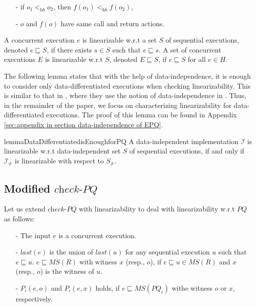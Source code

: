 \begin{itemize}
\item[-] if $o_1 <_{\textit{hb}} o_2$, then $f(o_1) <_{\textit{hb}} f(o_2)$,

\item[-] $o$ and $f(o)$ have same call and return actions.
\end{itemize}

A concurrent execution $e$ is linearizable w.r.t a set $S$ of sequential executions, denoted $e \sqsubseteq S$, if there exists $s \in S$ such that $e \sqsubseteq s$. A set of concurrent executions $E$ is linearizable w.r.t $S$, denoted $E \sqsubseteq S$, if $e \sqsubseteq S$ for all $e \in H$.

The following lemma states that with the help of data-independence, it is enough to consider only data-differentiated executions when checking linearizability. This is similar to that in \cite{Abdulla:2013}, where they use the notion of data-independence in \cite{Wolper:1986}. Thus, in the remainder of the paper, we focus on characterizing linearizability for data-differentiated executions. The proof of this lemma can be found in Appendix \ref{sec:appendix in section data-independence of EPQ}.

\begin{restatable}{lemma}{DataDifferentiatedisEnoughforPQ}
\label{lemma:data differentiated is enough for PQ}
A data-independent implementation $\mathcal{I}$ is linearizable w.r.t data-independent set $S$ of sequential executions, if and only if $\mathcal{I}_{\neq}$ is linearizable with respect to $S_{\neq}$.
\end{restatable}




\subsection{Modified $\textit{check-PQ}$}
\label{subsec:recursive procedure con-check-EPQ}

Let us extend $\textit{check-PQ}$ with linearizability to deal with linearizability w.r.t $\textit{PQ}$ as follows: 

\begin{itemize}
\setlength{\itemsep}{0.5pt}
\item[-] The input $e$ is a concurrent execution. 

\item[-] $\textit{last}(e)$ is the union of $\textit{last}(u)$ for any sequential execution $u$ such that $e \sqsubseteq u$. $e \sqsubseteq \textit{MS}(R)$ with witness $x$ (resp., $o$), if $e \sqsubseteq u \in \textit{MS}(R)$ and $x$ (resp., $o$) is the witness of $u$. 
    
\item[-] $P_i(e,o)$ and $P_i(e,x)$ holds, if $e \sqsubseteq \textit{MS}(\textit{PQ}_i)$ withe witness $o$ or $x$, respectively. 
\end{itemize} 

